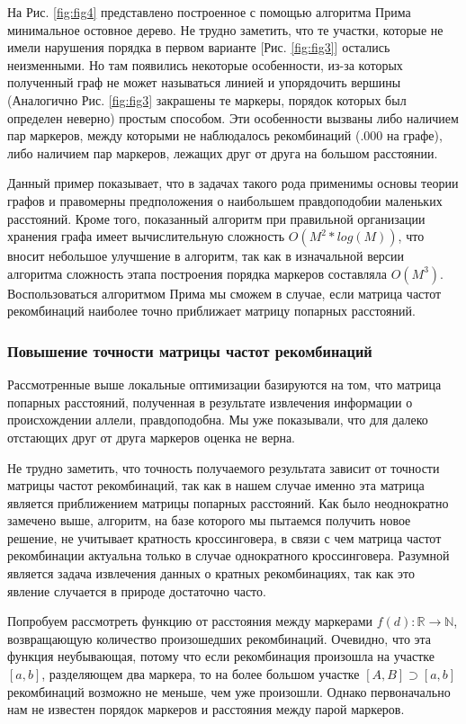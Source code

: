 \documentclass{matmex-diploma-custom}
\begin{document}
На Рис. \ref{fig:fig4} представлено построенное с помощью алгоритма
Прима минимальное остовное дерево. Не трудно заметить, что те участки,
которые не имели нарушения порядка в первом варианте
[Рис. \ref{fig:fig3}] остались неизменными. Но там появились некоторые
особенности, из-за которых полученный граф не может называться линией
и упорядочить вершины (Аналогично Рис. \ref{fig:fig3} закрашены те
маркеры, порядок которых был определен неверно) простым способом. Эти
особенности вызваны либо наличием пар маркеров, между которыми не
наблюдалось рекомбинаций (.000 на графе), либо наличием пар маркеров,
лежащих друг от друга на большом расстоянии.

Данный пример показывает, что в задачах такого рода применимы основы
теории графов и правомерны предположения о наибольшем правдоподобии
маленьких расстояний. Кроме того, показанный алгоритм при правильной
организации хранения графа имеет вычислительную сложность
$O(M^2*log(M))$, что вносит небольшое улучшение в алгоритм, так как в
изначальной версии алгоритма сложность этапа построения порядка
маркеров составляла $O(M^3)$. Воспользоваться алгоритмом Прима мы
сможем в случае, если матрица частот рекомбинаций наиболее точно
приближает матрицу попарных расстояний.

\subsubsection{Повышение точности матрицы частот рекомбинаций}

Рассмотренные выше локальные оптимизации базируются на том, что
матрица попарных расстояний, полученная в результате извлечения
информации о происхождении аллели, правдоподобна. Мы уже показывали,
что для далеко отстающих друг от друга маркеров оценка не верна.

Не трудно заметить, что точность получаемого результата зависит от
точности матрицы частот рекомбинаций, так как в нашем случае именно
эта матрица является приближением матрицы попарных расстояний.  Как
было неоднократно замечено выше, алгоритм, на базе которого мы
пытаемся получить новое решение, не учитывает кратность кроссинговера,
в связи с чем матрица частот рекомбинации актуальна только в случае
однократного кроссинговера. Разумной является задача извлечения данных
о кратных рекомбинациях, так как это явление случается в природе
достаточно часто.

Попробуем рассмотреть функцию от расстояния между маркерами
$f(d):\mathbb{R} \to \mathbb{N}$, возвращающую количество произошедших
рекомбинаций. Очевидно, что эта функция неубывающая, потому что если
рекомбинация произошла на участке $[a, b]$, разделяющем два маркера,
то на более большом участке $[A, B] \supset [a, b]$ рекомбинаций
возможно не меньше, чем уже произошли. Однако первоначально нам не
известен порядок маркеров и расстояния между парой маркеров.
\end{document}
